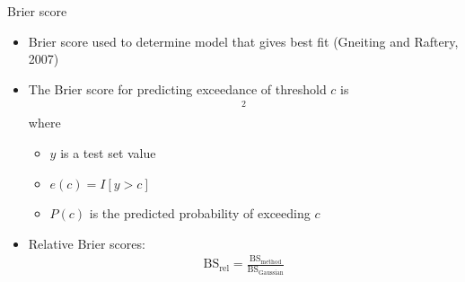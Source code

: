 \documentclass{beamer}
\begin{document}
\begin{frame}{Brier score}
  \begin{itemize} \setlength{\itemsep}{0.5em}
    \item Brier score used to determine model that gives best fit (Gneiting and Raftery, 2007)
    \item The Brier score for predicting exceedance of threshold $c$ is
    \begin{align*}
      [e(c) - P(c)]^2
    \end{align*}
    where
    \begin{itemize}
      \item $y$ is a test set value
      \item $e(c) = I[y > c]$
      \item $P(c)$ is the predicted probability of exceeding $c$
    \end{itemize}
    \item Relative Brier scores:
    \begin{align*}
      \text{BS}_\text{rel} = \frac{ \text{BS}_\text{method}}{ \text{BS}_\text{Gaussian}}
    \end{align*}
  \end{itemize}
\end{frame}
\end{document}

